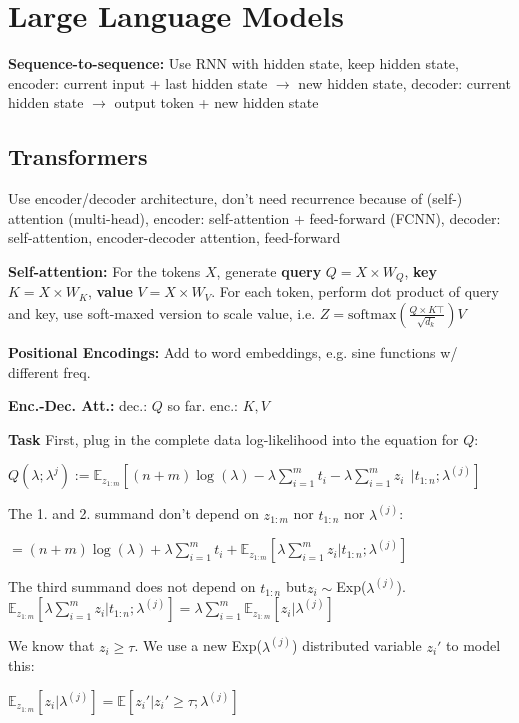 \section*{Large Language Models}
\textbf{Sequence-to-sequence:} Use RNN with hidden state, keep hidden state, encoder: 
current input + last hidden state $\rightarrow$ new hidden state, decoder: 
current hidden state $\rightarrow$ output token + new hidden state

\subsection*{Transformers}
Use encoder/decoder architecture, don't need recurrence because of (self-) attention (multi-head), 
encoder: self-attention + feed-forward (FCNN), decoder: self-attention, encoder-decoder attention, 
feed-forward

\textbf{Self-attention:} For the tokens $X$, generate 
\textbf{query} $Q = X \times W_Q$, \textbf{key} $K = X \times W_K$, \textbf{value} $V = X \times W_V$. 
For each token, perform dot product of query and key, use soft-maxed version to scale value, 
i.e. $Z = \text{softmax}(\frac{Q \times K\top}{\sqrt{d_k}}) V$

\textbf{Positional Encodings:} Add to word embeddings, e.g. sine functions w/ different freq.

\textbf{Enc.-Dec. Att.:} dec.: $Q$ so far. enc.: $K, V$

\textbf{Task}
First, plug in the complete data log-likelihood into the equation for $Q$:

\(Q(\lambda ; \lambda^{j}) := \mathbb{E}_{z_{1:m}}[(n+m)\log(\lambda) - \lambda \sum_{i=1}^mt_i - \lambda \sum_{i=1}^mz_i \ \ | t_{1:n} ; \lambda^{(j)}]\)

The 1. and 2. summand don't depend on $z_{1:m}$ nor $t_{1:n}$ nor $\lambda^{(j)}$:

\(= (n+m)\log(\lambda)+ \lambda \sum_{i=1}^m t_i+\mathbb{E}_{z_{1:m}}[\lambda\sum_{i=1}^mz_i | t_{1:n} ; \lambda^{(j)}]\)



The third summand does not depend on $t_{1:n}$ but\(z_i \sim \)Exp($\lambda^{(j)}$). 
\(\mathbb{E}_{z_{1:m}}[\lambda\sum_{i=1}^mz_i | t_{1:n} ; \lambda^{(j)}] = \lambda\sum_{i=1}^m \mathbb{E}_{z_{1:m}}[z_i | \lambda^{(j)}]\)

We know that $z_i \geq \tau$. We use a new Exp($\lambda^{(j)}$) distributed variable $z_i'$ to model this:

\(\mathbb{E}_{z_{1:m}}[z_i | \lambda^{(j)}] = \mathbb{E}[z_i' | z_i' \geq \tau ; \lambda^{(j)}]\)

